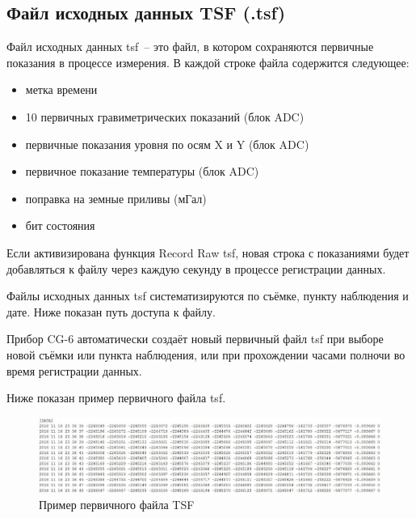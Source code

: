\subsection{Файл исходных данных TSF (.tsf)}

Файл исходных данных tsf~-- это файл, в котором сохраняются первичные
показания в процессе измерения. В каждой строке файла содержится следующее:
\begin{itemize}
  \item метка времени

  \item 10 первичных гравиметрических показаний (блок ADC)

  \item первичные показания уровня по осям X и Y (блок ADC)

  \item первичное показание температуры (блок ADC)

  \item поправка на земные приливы (мГал)

  \item бит состояния
\end{itemize}

Если активизирована функция Record Raw tsf, новая строка с показаниями будет
добавляться к файлу через каждую секунду в процессе регистрации данных.

Файлы исходных данных tsf систематизируются по съёмке, пункту наблюдения и
дате. Ниже показан путь доступа к файлу.


Прибор CG-6 автоматически создаёт новый первичный файл tsf при выборе новой
съёмки или пункта наблюдения, или при прохождении часами полночи во время
регистрации данных.

Ниже показан пример первичного файла tsf.

\begin{figure}[h]
  \centering
  \includegraphics[width=\textwidth]{figures/sample_raw_tsf_file_from_a_cg6_autograv}
  \caption{Пример первичного файла TSF \cg{}}
  \label{fig:sample_raw_tsf_file_from_a_cg6_autograv}
\end{figure}

